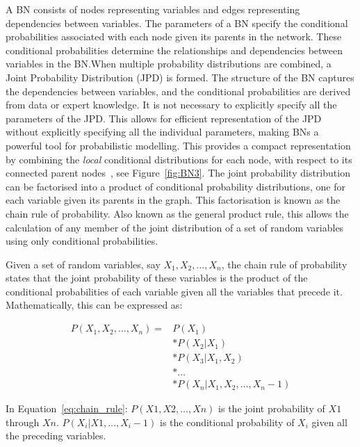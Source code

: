 \documentclass[journal]{IEEEtran}
\begin{document}
A BN consists of nodes representing variables and edges representing dependencies between variables. The parameters of a BN specify the conditional probabilities associated with each node given its parents in the network. These conditional probabilities determine the relationships and dependencies between variables in the BN.\@ When multiple probability distributions are combined, a Joint Probability Distribution (JPD) is formed.  The structure of the BN captures the dependencies between variables, and the conditional probabilities are derived from data or expert knowledge. It is not necessary to explicitly specify all the parameters of the JPD. This allows for efficient representation of the JPD without explicitly specifying all the individual parameters, making BNs a powerful tool for probabilistic modelling. This provides a compact representation by combining the \textit{local} conditional distributions for each node, with respect to its connected parent nodes~\cite{Koller2009}, see Figure~\ref{fig:BN3}. The joint probability distribution can be factorised into a product of conditional probability distributions, one for each variable given its parents in the graph. This factorisation is known as the chain rule of probability. Also known as the general product rule, this allows the calculation of any member of the joint distribution of a set of random variables using only conditional probabilities.

Given a set of random variables, say $X_1, X_2, \ldots, X_n$, the chain rule of probability states that the joint probability of these variables is the product of the conditional probabilities of each variable given all the variables that precede it. Mathematically, this can be expressed as:

\begin{align}
    P(X_1, X_2, \ldots, X_n) = & P(X_1) \nonumber \\
    & * P(X_2 | X_1) \nonumber \\
    & * P(X_3 | X_1, X_2) \nonumber \\
    & * \ldots \nonumber \\
    & * P(X_n | X_1, X_2, \ldots, X_n-1)
    \label{eq:chain_rule}
\end{align}
    
In Equation~\ref{eq:chain_rule}: $P(X1, X2, \ldots, Xn)$ is the joint probability of $X1$ through $Xn$. $P(X_i | X1, \ldots, X_i-1)$ is the conditional probability of $X_i$ given all the preceding variables.
\end{document}
